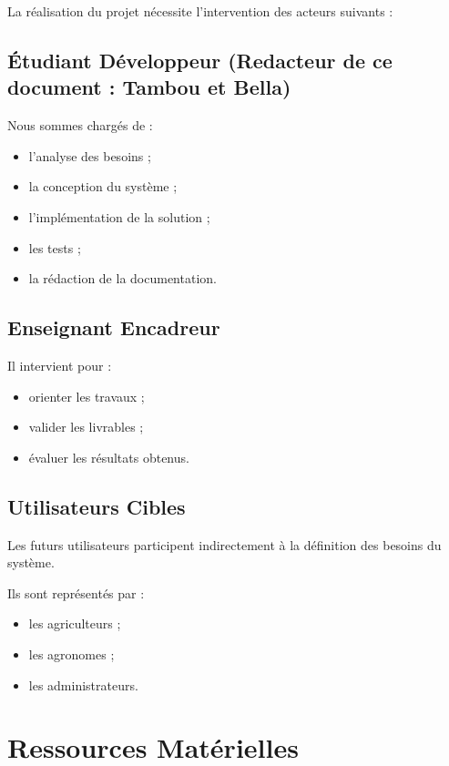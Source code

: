 \documentclass[12pt,a4paper]{report}
\begin{document}
La réalisation du projet nécessite l'intervention des acteurs suivants :

\subsection{Étudiant Développeur (Redacteur de ce document : Tambou et
Bella)}\label{uxe9tudiant-duxe9veloppeur-redacteur-de-ce-document-tambou-et-bella}

Nous sommes chargés de :

\begin{itemize}
\item
  l'analyse des besoins ;
\item
  la conception du système ;
\item
  l'implémentation de la solution ;
\item
  les tests ;
\item
  la rédaction de la documentation.
\end{itemize}

\subsection{Enseignant Encadreur}\label{enseignant-encadreur}

Il intervient pour :

\begin{itemize}
\item
  orienter les travaux ;
\item
  valider les livrables ;
\item
  évaluer les résultats obtenus.
\end{itemize}

\subsection{Utilisateurs Cibles}\label{utilisateurs-cibles}

Les futurs utilisateurs participent indirectement à la définition des
besoins du système.

Ils sont représentés par :

\begin{itemize}
\item
  les agriculteurs ;
\item
  les agronomes ;
\item
  les administrateurs.
\end{itemize}

\section{Ressources Matérielles}\label{ressources-matuxe9rielles}
\end{document}
